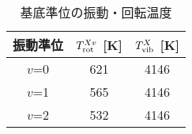 \begin{table}
    \caption{基底準位の振動・回転温度}
    \label{table:fitting-result}
    \centering
    \begin{tabular}{ccc}
        \hline
        振動準位 & $T^{Xv}_{\rm rot}$ [K] & $T^{X}_{\rm vib}$ [K]\\
        \hline
        $v$=0 & 621 & 4146\\
        $v$=1 & 565 & 4146\\
        $v$=2 & 532 & 4146\\
        \hline
    \end{tabular}
\end{table}
